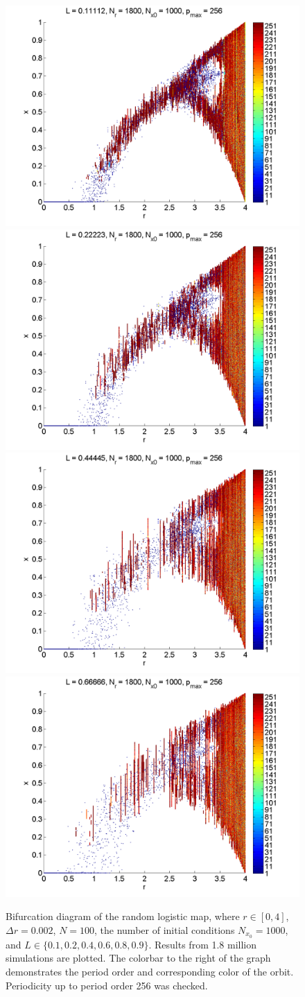 \begin{figure}[H]\linespread{1}
\caption[Bifurcation diagram of the random logistic map, high resolution]{Bifurcation diagram of the random
logistic map, where $r \in [0,4]$, $\Delta r = 0.002$, $N=100$, the
number of initial conditions $N_{x_0}=1000$, and $L\in
\{0.1,0.2,0.4,0.6,0.8,0.9\}$. Results from 1.8 million simulations are plotted. The colorbar to the right
of the graph demonstrates the period order and corresponding color of
the orbit. Periodicity up to period order 256 was checked.}
	\begin{center}
		\includegraphics[width=.5\textwidth]{figs/rlog_bif_L_01.png}\hfill
		\includegraphics[width=.5\textwidth]{figs/rlog_bif_L_02.png}\\
		\includegraphics[width=.5\textwidth]{figs/rlog_bif_L_04.png}\hfill
		\includegraphics[width=.5\textwidth]{figs/rlog_bif_L_06.png}\\

\end{center}
\end{figure}
